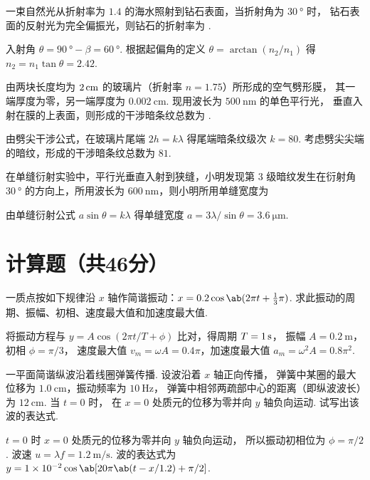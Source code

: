\documentclass[quiet]{ctexart}
\begin{document}
\begin{problem}
  一束自然光从折射率为 $1.4$ 的海水照射到钻石表面，当折射角为 $\qty{30}\degree$ 时，
  钻石表面的反射光为完全偏振光，则钻石的折射率为 .
\end{problem}
\begin{solution}
  入射角 $\theta = \qty{90}\degree - \beta = \qty{60}\degree$.
  根据起偏角的定义 $\theta = \arctan(n_2/n_1)$ 得 $n_2 = n_1\tan\theta = 2.42$.
\end{solution}

\begin{problem}
  由两块长度均为 $\qty2\cm$ 的玻璃片（折射率 $n = 1.75$）所形成的空气劈形膜，
  其一端厚度为零，另一端厚度为 $\qty{0.002}\cm$. 现用波长为 $\qty{500}\nm$ 的单色平行光，
  垂直入射在膜的上表面，则形成的干涉暗条纹总数为 .
\end{problem}
\begin{solution}
  由劈尖干涉公式，在玻璃片尾端 $2h = k\lambda$ 得尾端暗条纹级次 $k = 80$.
  考虑劈尖尖端的暗纹，形成的干涉暗条纹总数为 $81$.
\end{solution}

\begin{problem}
  在单缝衍射实验中，平行光垂直入射到狭缝，小明发现第 $3$ 级暗纹发生在衍射角 $\qty{30}\degree$
  的方向上，所用波长为 $\qty{600}\nm$，则小明所用单缝宽度为 
\end{problem}
\begin{solution}
  由单缝衍射公式 $a\sin\theta = k\lambda$
  得单缝宽度 $a = 3\lambda/\sin\theta = \qty{3.6}\um$.
\end{solution}

\section{计算题（共46分）}

\begin{problem}[本题5分]
  一质点按如下规律沿 $x$ 轴作简谐振动：$x = 0.2 \cos\ab(2\pi t + \frac13 \pi)$. 求此振动的周期、振幅、初相、速度最大值和加速度最大值.
\end{problem}
\begin{solution}
  将振动方程与 $y = A\cos(2\pi t/T + \phi)$ 比对，得周期 $T = \qty1\s$，
  振幅 $A = \qty{0.2}\m$，初相 $\phi = \pi/3$，
  速度最大值 $v_m = \omega A = 0.4\pi$，加速度最大值 $a_m = \omega^2 A = 0.8\pi^2$.
\end{solution}

\begin{problem}[本题8分]
  一平面简谐纵波沿着线圈弹簧传播. 设波沿着 $x$ 轴正向传播，
  弹簧中某圈的最大位移为 $\qty{1.0}\cm$，振动频率为 $\qty{10}\Hz$，
  弹簧中相邻两疏部中心的距离（即纵波波长）为 $\qty{12}\cm$. 当 $t = 0$ 时，
  在 $x = 0$ 处质元的位移为零并向 $y$ 轴负向运动. 试写出该波的表达式.
\end{problem}
\begin{solution}
  $t = 0$ 时 $x = 0$ 处质元的位移为零并向 $y$ 轴负向运动，
  所以振动初相位为 $\phi = \pi/2$. 波速 $u = \lambda f = \qty{1.2}{\m/\s}$.
  波的表达式为 $y = \num{1e-2} \cos\ab[20\pi\ab(t - x/1.2) + \pi/2]$.
\end{solution}
\end{document}

